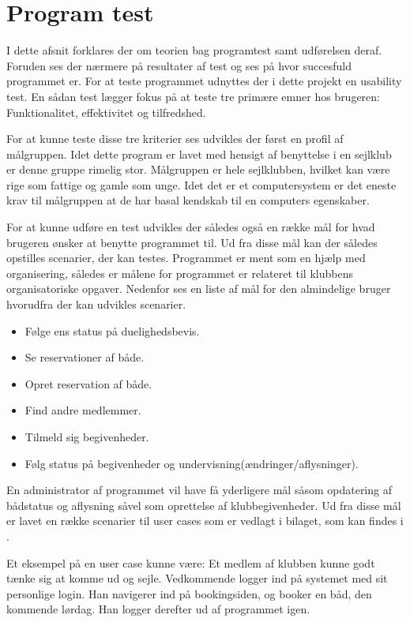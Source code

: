 \chapter{Program test}
I dette afsnit forklares der om teorien bag programtest samt udførelsen deraf. Foruden ses der nærmere på resultater af test og ses på hvor succesfuld programmet er. For at teste programmet udnyttes der i dette projekt en usability test. En sådan test lægger fokus på at teste tre primære emner hos brugeren: Funktionalitet, effektivitet og tilfredshed. 

For at kunne teste disse tre kriterier ses udvikles der først en profil af målgruppen. Idet dette program er lavet med hensigt af benyttelse i en sejlklub er denne gruppe rimelig stor. Målgruppen er hele sejlklubben, hvilket kan være rige som fattige og gamle som unge. Idet det er et computersystem er det eneste krav til målgruppen at de har basal kendskab til en computers egenskaber.

For at kunne udføre en test udvikles der således også en række mål for hvad brugeren ønsker at benytte programmet til. Ud fra disse mål kan der således opstilles scenarier, der kan testes. Programmet er ment som en hjælp med organisering, således er målene for programmet er relateret til klubbens organisatoriske opgaver. Nedenfor ses en liste af mål for den almindelige bruger hvorudfra der kan udvikles scenarier.

\begin{itemize}
  \item Følge ens status på duelighedsbevis.
  \item Se reservationer af både.
  \item Opret reservation af både.
  \item Find andre medlemmer.
  \item Tilmeld sig begivenheder.
  \item Følg status på begivenheder og undervisning(ændringer/aflysninger).
\end{itemize}

En administrator af programmet vil have få yderligere mål såsom opdatering af bådstatus og aflysning såvel som oprettelse af klubbegivenheder. Ud fra disse mål er lavet en række scenarier til user cases som er vedlagt i bilaget, som kan findes i . 

\cbstart
Et eksempel på en user case kunne være: Et medlem af klubben kunne godt tænke sig at komme ud og sejle. Vedkommende logger ind på systemet med sit personlige login. Han navigerer ind på bookingsiden, og booker en båd, den kommende lørdag. Han logger derefter ud af programmet igen.

